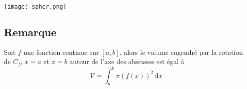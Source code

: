 \documentclass[12pt]{article}
\begin{document}
\begin{center}
    \texttt{[image: spher.png]}
\end{center}

\subsection*{Remarque}

Soit $f$ une fonction continue sur $[a, b]$, alors le volume engendré par la rotation de $C_{f}$, $x=a$ et $x=b$ autour de l'axe des abscisses est égal à 
$$\mathcal{V}=\int_{a}^{b} \pi (f(x))^{2} \, \mathrm{d}x$$ 
\end{document}
